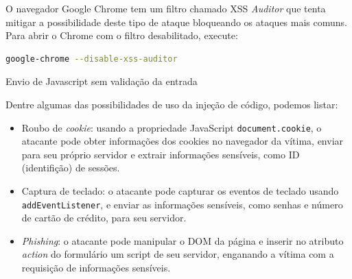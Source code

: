 \begin{frame}[fragile]{}

O navegador Google Chrome tem um filtro chamado XSS {\it Auditor\/} que
tenta mitigar a possibilidade deste tipo de ataque bloqueando os
ataques mais comuns. Para abrir o Chrome com o filtro desabilitado,
execute:

\begin{lstlisting}[language=bash]
 google-chrome --disable-xss-auditor
\end{lstlisting}

\end{frame}

\begin{frame}{}{Envio de Javascript sem validação da entrada}

Dentre algumas das possibilidades de uso da injeção de código, podemos
listar:

\begin{itemize}
\item Roubo de {\it cookie\/}: usando a propriedade JavaScript {\tt document.cookie},
  o atacante pode obter informações dos cookies no
  navegador da vítima, enviar para seu próprio servidor e extrair
  informações sensíveis, como ID (identifição) de sessões.\pause
\item Captura de teclado: o atacante pode capturar os eventos de
  teclado usando {\tt addEventListener}, e enviar as informações
  sensíveis, como senhas e número de cartão de crédito, para seu
  servidor.\pause
\item {\it Phishing\/}: o atacante pode manipular o DOM da página e
  inserir no atributo {\it action\/} do formulário um script de seu
  servidor, enganando a vítima com a requisição de informações
  sensíveis.
\end{itemize}

\end{frame}

